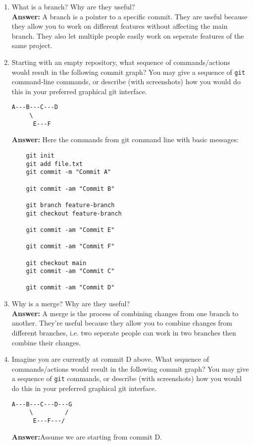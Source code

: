 \documentclass[10pt,twocolumn]{article}
\begin{document}
\begin{enumerate}
\item What is a branch? Why are they useful?\\
    \textbf{Answer:}
    A branch is a pointer to a specific commit. They are useful because they allow you to work on different features without affecting the main branch. They also let multiple people easily work on seperate features of the same project.

\item Starting with an empty repository, what sequence of commands/actions would result in the following commit graph? You may give a sequence of \texttt{git} command-line commands, or describe (with screenshots) how you would do this in your preferred graphical git interface.
\begin{verbatim}
A---B---C---D
     \
      E---F
\end{verbatim}
    \textbf{Answer:} Here the commands from git command line with basic messages:
\begin{verbatim}
    git init
    git add file.txt
    git commit -m "Commit A"

    git commit -am "Commit B"

    git branch feature-branch 
    git checkout feature-branch

    git commit -am "Commit E"

    git commit -am "Commit F"

    git checkout main
    git commit -am "Commit C"

    git commit -am "Commit D"
\end{verbatim}

\item Why is a merge? Why are they useful?\\
    \textbf{Answer:}
    A merge is the process of combining changes from one branch to another. They're useful because they allow you to combine changes from different branches, i.e. two seperate people can work in two branches then combine their changes.

\item Imagine you are currently at commit D above. What sequence of commands/actions would result in the following commit graph? You may give a sequence of \texttt{git} commands, or describe (with screenshots) how you would do this in your preferred graphical git interface.
\begin{verbatim}
A---B---C---D---G
     \         /
      E---F---/
\end{verbatim}
    \textbf{Answer:}Assume we are starting from commit D.


\end{enumerate}
\end{document}
